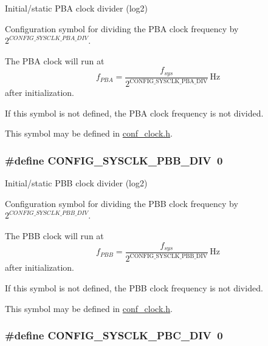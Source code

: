 \-Initial/static \-P\-B\-A clock divider (log2) 

\-Configuration symbol for dividing the \-P\-B\-A clock frequency by $2^{CONFIG\_SYSCLK\_PBA\_DIV}$.

\-The \-P\-B\-A clock will run at \[ f_{PBA} = \frac{f_{sys}}{2^\mathrm{CONFIG\_SYSCLK\_PBA\_DIV}}\,\mbox{Hz} \] after initialization.

\-If this symbol is not defined, the \-P\-B\-A clock frequency is not divided.

\-This symbol may be defined in \hyperlink{conf__clock_8h}{conf\-\_\-clock.\-h}. \hypertarget{group__sysclk__group_ga50962c914daa31fbc279cd4bccf66f98}{
\subsubsection[{\-C\-O\-N\-F\-I\-G\-\_\-\-S\-Y\-S\-C\-L\-K\-\_\-\-P\-B\-B\-\_\-\-D\-I\-V}]{\setlength{\rightskip}{0pt plus 5cm}\#define \-C\-O\-N\-F\-I\-G\-\_\-\-S\-Y\-S\-C\-L\-K\-\_\-\-P\-B\-B\-\_\-\-D\-I\-V~0}}
\label{group__sysclk__group_ga50962c914daa31fbc279cd4bccf66f98}


\-Initial/static \-P\-B\-B clock divider (log2) 

\-Configuration symbol for dividing the \-P\-B\-B clock frequency by $2^{CONFIG\_SYSCLK\_PBB\_DIV}$.

\-The \-P\-B\-B clock will run at \[ f_{PBB} = \frac{f_{sys}}{2^\mathrm{CONFIG\_SYSCLK\_PBB\_DIV}}\,\mbox{Hz} \] after initialization.

\-If this symbol is not defined, the \-P\-B\-B clock frequency is not divided.

\-This symbol may be defined in \hyperlink{conf__clock_8h}{conf\-\_\-clock.\-h}. \hypertarget{group__sysclk__group_gaa31e8248ac7b461b19f7ec827674d16c}{
\subsubsection[{\-C\-O\-N\-F\-I\-G\-\_\-\-S\-Y\-S\-C\-L\-K\-\_\-\-P\-B\-C\-\_\-\-D\-I\-V}]{\setlength{\rightskip}{0pt plus 5cm}\#define \-C\-O\-N\-F\-I\-G\-\_\-\-S\-Y\-S\-C\-L\-K\-\_\-\-P\-B\-C\-\_\-\-D\-I\-V~0}}
\label{group__sysclk__group_gaa31e8248ac7b461b19f7ec827674d16c}


